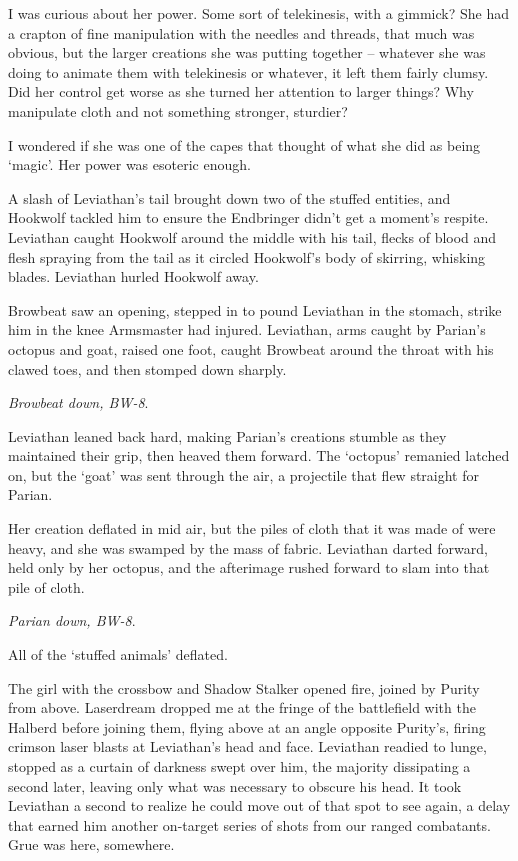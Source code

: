 I was curious about her power.  Some sort of telekinesis, with a gimmick?  She had a crapton of fine manipulation with the needles and threads, that much was obvious, but the larger creations she was putting together – whatever she was doing to animate them with telekinesis or whatever, it left them fairly clumsy.  Did her control get worse as she turned her attention to larger things?  Why manipulate cloth and not something stronger, sturdier?



I wondered if she was one of the capes that thought of what she did as being `magic'.  Her power was esoteric enough.



A slash of Leviathan's tail brought down two of the stuffed entities, and Hookwolf tackled him to ensure the Endbringer didn't get a moment's respite.  Leviathan caught Hookwolf around the middle with his tail, flecks of blood and flesh spraying from the tail as it circled Hookwolf's body of skirring, whisking blades.  Leviathan hurled Hookwolf away.



Browbeat saw an opening, stepped in to pound Leviathan in the stomach, strike him in the knee Armsmaster had injured.  Leviathan, arms caught by Parian's octopus and goat, raised one foot, caught Browbeat around the throat with his clawed toes, and then stomped down sharply.



\emph{Browbeat down, BW-8}.



Leviathan leaned back hard, making Parian's creations stumble as they maintained their grip, then heaved them forward.  The `octopus' remanied latched on, but the `goat' was sent through the air, a projectile that flew straight for Parian.



Her creation deflated in mid air, but the piles of cloth that it was made of were heavy, and she was swamped by the mass of fabric.  Leviathan darted forward, held only by her octopus, and the afterimage rushed forward to slam into that pile of cloth.



\emph{Parian down, BW-8}.



All of the `stuffed animals' deflated.



The girl with the crossbow and Shadow Stalker opened fire, joined by Purity from above.   Laserdream dropped me at the fringe of the battlefield with the Halberd before joining them, flying above at an angle opposite Purity's, firing crimson laser blasts at Leviathan's head and face.  Leviathan readied to lunge, stopped as a curtain of darkness swept over him, the majority dissipating a second later, leaving only what was necessary to obscure his head.  It took Leviathan a second to realize he could move out of that spot to see again, a delay that earned him another on-target series of shots from our ranged combatants.  Grue was here, somewhere.



